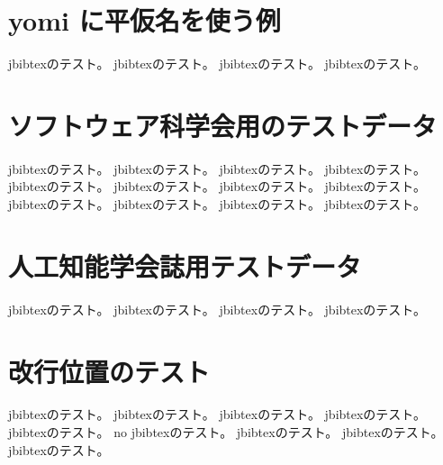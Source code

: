 \documentclass{ujarticle}
\def\withsetthreetmp{no}
\begin{document}
\section{yomi に平仮名を使う例}

jbibtexのテスト\cite{goto-h}。
jbibtexのテスト\cite{磯崎-h}。
jbibtexのテスト\cite{斉藤-h}。
jbibtexのテスト\cite{multi-h}。

\section{ソフトウェア科学会用のテストデータ}

jbibtexのテスト\cite{ama}。
jbibtexのテスト\cite{Arv}。
jbibtexのテスト\cite{cha}。
jbibtexのテスト\cite{dav}。
jbibtexのテスト\cite{den}。
jbibtexのテスト\cite{fis}。
jbibtexのテスト\cite{gajski}。
jbibtexのテスト\cite{suna1}。
jbibtexのテスト\cite{suna2}。
jbibtexのテスト\cite{toko1}。
jbibtexのテスト\cite{toko2}。
jbibtexのテスト\cite{suna86}。

\section{人工知能学会誌用テストデータ}

jbibtexのテスト\cite{onda}。
jbibtexのテスト\cite{近藤}。
jbibtexのテスト\cite{JSAI-1}。
jbibtexのテスト\cite{grosz}。

\section{改行位置のテスト}

jbibtexのテスト\cite{改行位置2a}。
jbibtexのテスト\cite{改行位置2b}。
jbibtexのテスト\cite{改行位置3a}。
jbibtexのテスト\cite{改行位置3b}。
jbibtexのテスト\cite{改行位置3c}。
\ifx\withsetthree\withsetthreetmp\else
jbibtexのテスト\cite{改行位置4a}。
jbibtexのテスト\cite{改行位置4b}。
jbibtexのテスト\cite{改行位置4c}。
jbibtexのテスト\cite{改行位置4d}。
\fi


%

%
%
%



\end{document}
